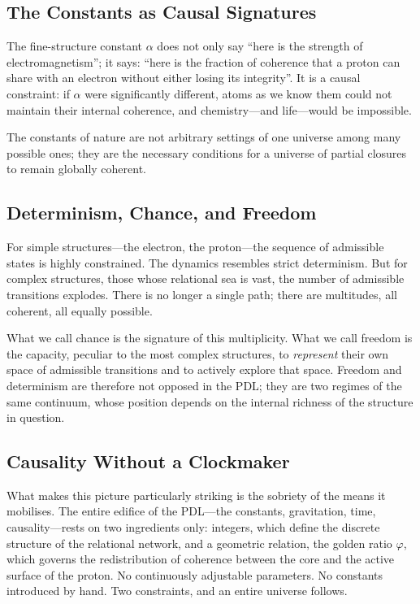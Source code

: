 \documentclass[12pt, a4paper, openright]{book}
\begin{document}
\subsection*{The Constants as Causal Signatures}

The fine-structure constant $\alpha$ does not only say ``here is the strength of electromagnetism''; it says: ``here is the fraction of coherence that a proton can share with an electron without either losing its integrity''. It is a causal constraint: if $\alpha$ were significantly different, atoms as we know them could not maintain their internal coherence, and chemistry---and life---would be impossible.

\medskip

The constants of nature are not arbitrary settings of one universe among many possible ones; they are the necessary conditions for a universe of partial closures to remain globally coherent.

\subsection*{Determinism, Chance, and Freedom}

For simple structures---the electron, the proton---the sequence of admissible states is highly constrained. The dynamics resembles strict determinism. But for complex structures, those whose relational sea is vast, the number of admissible transitions explodes. There is no longer a single path; there are multitudes, all coherent, all equally possible.

\medskip

What we call chance is the signature of this multiplicity. What we call freedom is the capacity, peculiar to the most complex structures, to \emph{represent} their own space of admissible transitions and to actively explore that space. Freedom and determinism are therefore not opposed in the PDL; they are two regimes of the same continuum, whose position depends on the internal richness of the structure in question.

\subsection*{Causality Without a Clockmaker}

What makes this picture particularly striking is the sobriety of the means it mobilises. The entire edifice of the PDL---the constants, gravitation, time, causality---rests on two ingredients only: integers, which define the discrete structure of the relational network, and a geometric relation, the golden ratio $\varphi$, which governs the redistribution of coherence between the core and the active surface of the proton. No continuously adjustable parameters. No constants introduced by hand. Two constraints, and an entire universe follows.
\end{document}
